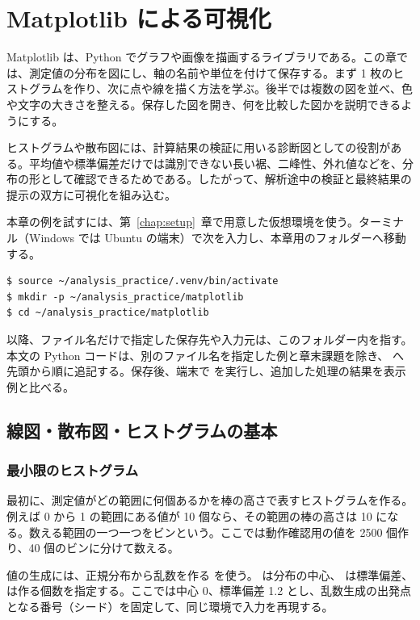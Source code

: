 \chapter{Matplotlib による可視化}
\label{chap:matplotlib}

Matplotlib は、Python でグラフや画像を描画するライブラリである。この章では、測定値の分布を図にし、軸の名前や単位を付けて保存する。まず 1 枚のヒストグラムを作り、次に点や線を描く方法を学ぶ。後半では複数の図を並べ、色や文字の大きさを整える。保存した図を開き、何を比較した図かを説明できるようにする。

ヒストグラムや散布図には、計算結果の検証に用いる診断図としての役割がある。平均値や標準偏差だけでは識別できない長い裾、二峰性、外れ値などを、分布の形として確認できるためである。したがって、解析途中の検証と最終結果の提示の双方に可視化を組み込む。

本章の例を試すには、第~\ref{chap:setup}~章で用意した仮想環境を使う。ターミナル（Windows では Ubuntu の端末）で次を入力し、本章用のフォルダーへ移動する。

\begin{lstlisting}[numbers=none, xleftmargin=2\zw]
$ source ~/analysis_practice/.venv/bin/activate
$ mkdir -p ~/analysis_practice/matplotlib
$ cd ~/analysis_practice/matplotlib
\end{lstlisting}

以降、ファイル名だけで指定した保存先や入力元は、このフォルダー内を指す。本文の Python コードは、別のファイル名を指定した例と章末課題を除き、 へ先頭から順に追記する。保存後、端末で  を実行し、追加した処理の結果を表示例と比べる。

\section{線図・散布図・ヒストグラムの基本}

\subsection{最小限のヒストグラム}

最初に、測定値がどの範囲に何個あるかを棒の高さで表すヒストグラムを作る。例えば 0 から 1 の範囲にある値が 10 個なら、その範囲の棒の高さは 10 になる。数える範囲の一つ一つをビンという。ここでは動作確認用の値を 2500 個作り、40 個のビンに分けて数える。

値の生成には、正規分布から乱数を作る  を使う。 は分布の中心、 は標準偏差、 は作る個数を指定する。ここでは中心 0、標準偏差 1.2 とし、乱数生成の出発点となる番号（シード）を固定して、同じ環境で入力を再現する。

